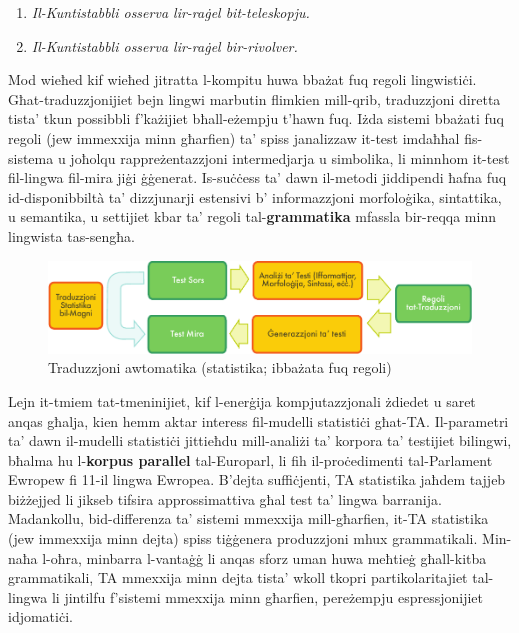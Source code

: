 \documentclass[]{../../metanetpaper}
\begin{document}
\begin{multicols}{2}
\begin{enumerate}%
\item \emph{Il-Kuntistabbli osserva lir-raġel bit-teleskopju.}
\item \emph{Il-Kuntistabbli osserva lir-raġel bir-rivolver.}
\end{enumerate}

Mod wieħed kif wieħed jitratta l-kompitu huwa bbażat fuq regoli lingwistiċi. Għat-traduzzjonijiet bejn lingwi marbutin flimkien mill-qrib, traduzzjoni diretta tista’ tkun possibbli f'każijiet bħall-eżempju t’hawn fuq. Iżda sistemi bbażati fuq regoli (jew immexxija minn għarfien) ta’ spiss janalizzaw it-test imdaħħal fis-sistema u joħolqu rappreżentazzjoni intermedjarja u simbolika, li minnhom it-test fil-lingwa fil-mira jiġi ġġenerat. Is-suċċess ta’ dawn il-metodi jiddipendi ħafna fuq id-disponibbiltà ta’ dizzjunarji estensivi b’ informazzjoni morfoloġika, sintattika, u semantika, u settijiet kbar ta’ regoli tal-\textbf{grammatika} mfassla bir-reqqa minn lingwista tas-sengħa.

\begin{figure}[htb]
  \centering
  \includegraphics[width=\textwidth]{../_media/maltese/machine_translation}
  \caption{Traduzzjoni awtomatika (statistika; ibbażata fuq regoli)}
  \label{fig:mtarch_mt}
\end{figure}

Lejn it-tmiem tat-tmeninijiet, kif l-enerġija kompjutazzjonali żdiedet u saret anqas għalja, kien hemm aktar interess fil-mudelli statistiċi għat-TA. Il-parametri ta’ dawn il-mudelli statistiċi jittieħdu mill-analiżi ta’ korpora ta’ testijiet bilingwi, bħalma hu l-\textbf{korpus parallel} tal-Europarl, li fih il-proċedimenti tal-Parlament Ewropew fi 11-il lingwa Ewropea. B’dejta suffiċjenti, TA statistika jaħdem tajjeb biżżejjed li jikseb tifsira approssimattiva għal test ta’ lingwa barranija. Madankollu, bid-differenza ta’ sistemi mmexxija mill-għarfien, it-TA statistika (jew immexxija minn dejta) spiss tiġġenera produzzjoni mhux grammatikali. Min-naħa l-oħra, minbarra l-vantaġġ li anqas sforz uman huwa meħtieġ għall-kitba grammatikali, TA mmexxija minn dejta tista’ wkoll tkopri partikolaritajiet tal-lingwa li jintilfu f’sistemi mmexxija minn għarfien, pereżempju espressjonijiet idjomatiċi.


\end{multicols}
\end{document}
